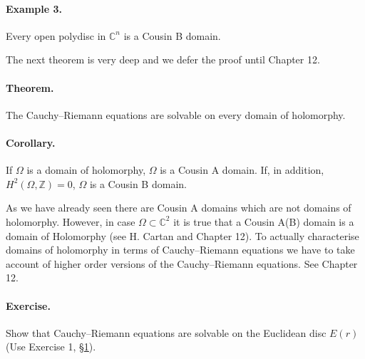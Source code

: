 \paragraph*{Example 3.} Every open polydisc in $\mathbb C^n$ is a Cousin B domain.

The next theorem is very deep and we defer the proof until Chapter 12.
\paragraph*{Theorem.} The Cauchy--Riemann equations are solvable on every domain of holomorphy.
\paragraph*{Corollary.} If $\Omega$ is a domain of holomorphy, $\Omega$ is a Cousin A domain. If, in addition, $H^2(\Omega,\mathbb Z)=0$, $\Omega$ is a Cousin B domain.

As we have already seen there are Cousin A domains which are not domains of holomorphy. However, in case $\Omega\subset\mathbb C^2$ it is true that a Cousin A(B) domain is a domain of Holomorphy (see H. Cartan \cite{bib:I:cartan-h:2} and Chapter 12). To actually characterise domains of holomorphy in terms of Cauchy--Riemann equations we have to take account of higher order versions of the Cauchy--Riemann equations. See Chapter 12.
\paragraph*{Exercise.} Show that Cauchy--Riemann equations are solvable on the Euclidean disc $E(r)$ (Use Exercise 1, \hyperref[sec:2:1]{\S1}).
